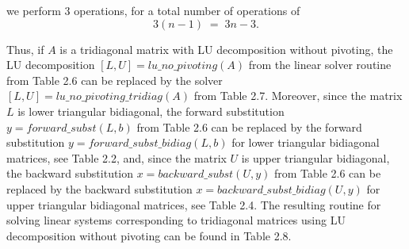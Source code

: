 we perform $3$ operations, for a total number of operations of
\begin{equation}
3(n-1) \;=\; 3n-3.
\end{equation}

Thus, if $A$ is a tridiagonal matrix with LU decomposition without pivoting, the
LU decomposition $[L,U] = lu\_no\_pivoting(A)$ from the linear solver routine from
Table 2.6 can be replaced by the solver $[L,U] = lu\_no\_pivoting\_tridiag(A)$ from
Table 2.7.
Moreover, since the matrix $L$ is lower triangular bidiagonal, the forward
substitution $y = forward\_subst(L,b)$ from Table 2.6 can be replaced by the
forward substitution $y = forward\_subst\_bidiag(L,b)$ for lower triangular
bidiagonal matrices, see Table 2.2, and, since the matrix $U$ is upper triangular
bidiagonal, the backward substitution $x = backward\_subst(U,y)$ from Table 2.6 can
be replaced by the backward substitution $x = backward\_subst\_bidiag(U,y)$ for
upper triangular bidiagonal matrices, see Table 2.4.
The resulting routine for solving linear systems corresponding to tridiagonal
matrices using LU decomposition without pivoting can be found in Table 2.8.

\begin{table}[H]
\centering
\caption{LU decomposition without pivoting for tridiagonal matrices}
\end{table}

